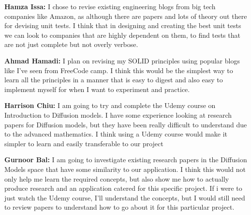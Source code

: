 \documentclass[12pt, titlepage]{article}
\begin{document}
\textbf{Hamza Issa:} I chose to revise existing engineering blogs from big tech companies like Amazon, as although there are papers and lots of theory out there for devising unit tests. I think that in designing and creating the best unit tests we can look to companies that are highly dependent on them, to find tests that are not just complete but not overly verbose.

\textbf{Ahmad Hamadi:} I plan on revising my SOLID principles using popular blogs like I've seen from FreeCode camp. I think this would be the simplest way to learn all the principles in a manner that is easy to digest and also easy to implement myself for when I want to experiment and practice.

\textbf{Harrison Chiu:} I am going to try and complete the Udemy course on Introduction to Diffusion models. I have some experience looking at research papers for Diffusion models, but they have been really difficult to understand due to the advanced mathematics. I think using a Udemy course would make it simpler to learn and easily transferable to our project

\textbf{Gurnoor Bal:} I am going to investigate existing research papers in the Diffusion Models space that have some similarity to our application. I think this would not only help me learn the required concepts, but also show me how to actually produce research and an application catered for this specific project. If i were to just watch the Udemy course, I'll understand the concepts, but I would still need to review papers to understand how to go about it for this particular project.
\end{document}
